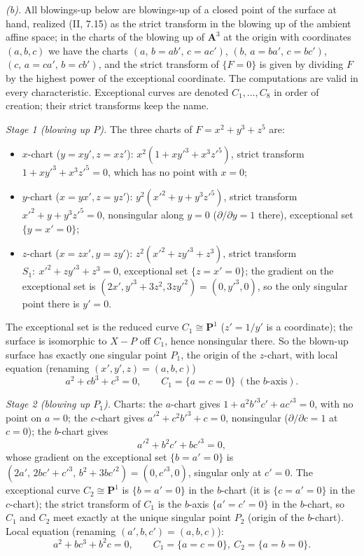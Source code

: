 \documentclass[11pt]{article}
\begin{document}
\emph{(b).} All blowings-up below are blowings-up of a closed point of the surface at hand, realized (II, 7.15) as the strict transform in the blowing up of the ambient affine space; in the charts of the blowing up of $\mathbf A^3$ at the origin with coordinates $(a,b,c)$ we have the charts $(a,\,b=ab',\,c=ac')$, $(b,\,a=ba',\,c=bc')$, $(c,\,a=ca',\,b=cb')$, and the strict transform of $\{F=0\}$ is given by dividing $F$ by the highest power of the exceptional coordinate. The computations are valid in every characteristic. Exceptional curves are denoted $C_1,\dots,C_8$ in order of creation; their strict transforms keep the name.

\emph{Stage 1 (blowing up $P$).} The three charts of $F=x^2+y^3+z^5$ are:
\begin{itemize}
\item $x$-chart ($y=xy',z=xz'$): $x^2(1+xy'^3+x^3z'^5)$, strict transform $1+xy'^3+x^3z'^5=0$, which has no point with $x=0$;
\item $y$-chart ($x=yx',z=yz'$): $y^2(x'^2+y+y^3z'^5)$, strict transform $x'^2+y+y^3z'^5=0$, nonsingular along $y=0$ ($\partial/\partial y=1$ there), exceptional set $\{y=x'=0\}$;
\item $z$-chart ($x=zx',y=zy'$): $z^2(x'^2+zy'^3+z^3)$, strict transform $S_1:\ x'^2+zy'^3+z^3=0$, exceptional set $\{z=x'=0\}$; the gradient on the exceptional set is $(2x',y'^3+3z^2,3zy'^2)=(0,y'^3,0)$, so the only singular point there is $y'=0$.
\end{itemize}
The exceptional set is the reduced curve $C_1\cong\mathbf P^1$ ($z'=1/y'$ is a coordinate); the surface is isomorphic to $X-P$ off $C_1$, hence nonsingular there. So the blown-up surface has exactly one singular point $P_1$, the origin of the $z$-chart, with local equation (renaming $(x',y',z)=(a,b,c)$)
\[
a^2+cb^3+c^3=0,\qquad C_1=\{a=c=0\}\ (\text{the }b\text{-axis}).
\]

\emph{Stage 2 (blowing up $P_1$).} Charts: the $a$-chart gives $1+a^2b'^3c'+ac'^3=0$, with no point on $a=0$; the $c$-chart gives $a'^2+c^2b'^3+c=0$, nonsingular ($\partial/\partial c=1$ at $c=0$); the $b$-chart gives
\[
a'^2+b^2c'+bc'^3=0,
\]
whose gradient on the exceptional set $\{b=a'=0\}$ is $(2a',\,2bc'+c'^3,\,b^2+3bc'^2)=(0,c'^3,0)$, singular only at $c'=0$. The exceptional curve $C_2\cong\mathbf P^1$ is $\{b=a'=0\}$ in the $b$-chart (it is $\{c=a'=0\}$ in the $c$-chart); the strict transform of $C_1$ is the $b$-axis $\{a'=c'=0\}$ in the $b$-chart, so $C_1$ and $C_2$ meet exactly at the unique singular point $P_2$ (origin of the $b$-chart). Local equation (renaming $(a',b,c')=(a,b,c)$):
\[
a^2+bc^3+b^2c=0,\qquad C_1=\{a=c=0\},\ C_2=\{a=b=0\}.
\]
\end{document}
